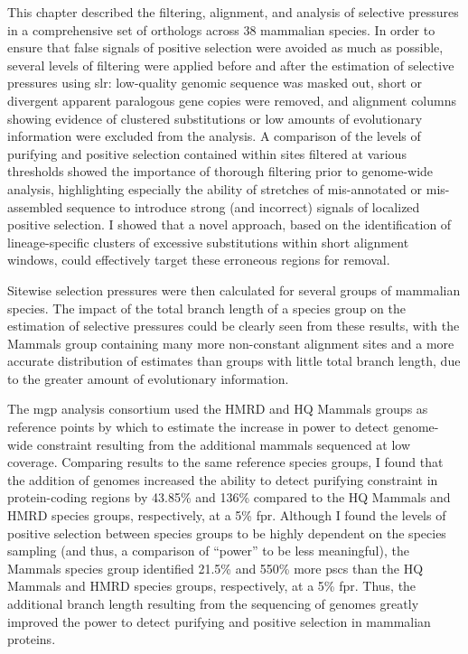 This chapter described the filtering, alignment, and analysis of \sw
selective pressures in a comprehensive set of orthologs across 38
mammalian species. In order to ensure that false signals of positive
selection were avoided as much as possible, several levels of
filtering were applied before and after the estimation of \sw
selective pressures using \ac{slr}: low-quality genomic sequence was
masked out, short or divergent apparent paralogous gene copies were
removed, and alignment columns showing evidence of clustered \nsyn
substitutions or low amounts of evolutionary information were excluded
from the analysis. A comparison of the levels of purifying and
positive selection contained within sites filtered at various
thresholds showed the importance of thorough filtering prior to
genome-wide analysis, highlighting especially the ability of stretches
of mis-annotated or mis-assembled sequence to introduce strong (and
incorrect) signals of localized positive selection. I showed that a
novel approach, based on the identification of lineage-specific
clusters of excessive \nsyn substitutions within short alignment
windows, could effectively target these erroneous regions for removal.

Sitewise selection pressures were then calculated for several groups
of mammalian species. The impact of the total branch length of a
species group on the estimation of \sw selective pressures could be
clearly seen from these results, with the Mammals group containing
many more non-constant alignment sites and a more accurate
distribution of \omgml estimates than groups with little total branch
length, due to the greater amount of evolutionary information.

The \ac{mgp} analysis consortium used the HMRD and HQ Mammals groups
as reference points by which to estimate the increase in power to
detect genome-wide constraint resulting from the additional mammals
sequenced at low coverage. Comparing \sw results to the same reference
species groups, I found that the addition of \lcv genomes increased
the ability to detect purifying constraint in protein-coding regions
by 43.85\% and 136\% compared to the HQ Mammals and HMRD species
groups, respectively, at a 5\% \ac{fpr}. Although I found the levels
of positive selection between species groups to be highly dependent on
the species sampling (and thus, a comparison of ``power'' to be less
meaningful), the Mammals species group identified 21.5\% and 550\%
more \acp{psc} than the HQ Mammals and HMRD species groups,
respectively, at a 5\% \ac{fpr}. Thus, the additional branch length
resulting from the sequencing of \lcv genomes greatly improved the
power to detect purifying and positive selection in mammalian
proteins.

